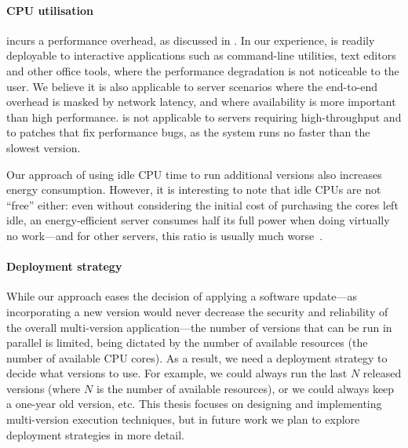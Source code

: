 
\paragraph{CPU utilisation} \mx incurs a performance overhead, as discussed in
.  In our experience, \mx is readily deployable to
interactive applications such as command-line utilities, text editors and other
office tools, where the performance degradation is not noticeable to the user.
We believe it is also applicable to server scenarios where the end-to-end
overhead is masked by network latency, and where availability is more important
than high performance.  \mx is not applicable to servers requiring
high-throughput and to patches that fix performance bugs, as the system runs no
faster than the slowest version.

Our approach of using idle CPU time to run additional versions also increases
energy consumption.  However, it is interesting to note that idle CPUs are not
``free'' either: even without considering the initial cost of purchasing the
cores left idle, an energy-efficient server consumes half its full power when
doing virtually no work---and for other servers, this ratio is usually much
worse~\cite{barroso2007}.

\paragraph{Deployment strategy} While our approach eases the decision of
applying a software update---as incorporating a new version would never
decrease the security and reliability of the overall multi-version
application---the number of versions that can be run in parallel is limited,
being dictated by the number of available resources (\eg the number of
available CPU cores).  As a result, we need a deployment strategy to decide
what versions to use.  For example, we could always run the last $N$ released
versions (where $N$ is the number of available resources), or we could always
keep a one-year old version, etc.  This thesis focuses on designing and
implementing multi-version execution techniques, but in future work we plan to
explore deployment strategies in more detail.
